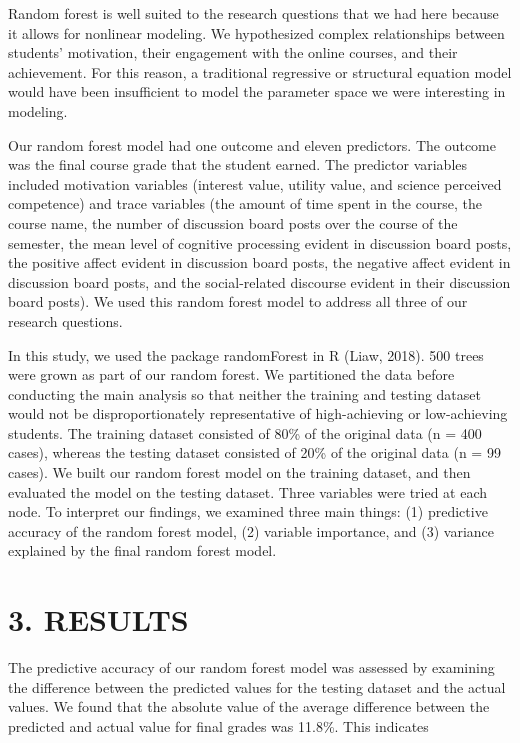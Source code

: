 \documentclass[acmart]{apa6}
\theoremstyle{definition}
\theoremstyle{definition}
\theoremstyle{definition}
\theoremstyle{remark}
\begin{document}
Random forest is well suited to the research questions that we had here
because it allows for nonlinear modeling. We hypothesized complex
relationships between students' motivation, their engagement with the
online courses, and their achievement. For this reason, a traditional
regressive or structural equation model would have been insufficient to
model the parameter space we were interesting in modeling.

Our random forest model had one outcome and eleven predictors. The
outcome was the final course grade that the student earned. The
predictor variables included motivation variables (interest value,
utility value, and science perceived competence) and trace variables
(the amount of time spent in the course, the course name, the number of
discussion board posts over the course of the semester, the mean level
of cognitive processing evident in discussion board posts, the positive
affect evident in discussion board posts, the negative affect evident in
discussion board posts, and the social-related discourse evident in
their discussion board posts). We used this random forest model to
address all three of our research questions.

In this study, we used the package randomForest in R (Liaw, 2018). 500
trees were grown as part of our random forest. We partitioned the data
before conducting the main analysis so that neither the training and
testing dataset would not be disproportionately representative of
high-achieving or low-achieving students. The training dataset consisted
of 80\% of the original data (n = 400 cases), whereas the testing
dataset consisted of 20\% of the original data (n = 99 cases). We built
our random forest model on the training dataset, and then evaluated the
model on the testing dataset. Three variables were tried at each node.
To interpret our findings, we examined three main things: (1) predictive
accuracy of the random forest model, (2) variable importance, and (3)
variance explained by the final random forest model.

\section{3. RESULTS}\label{results}

The predictive accuracy of our random forest model was assessed by
examining the difference between the predicted values for the testing
dataset and the actual values. We found that the absolute value of the
average difference between the predicted and actual value for final
grades was 11.8\%. This indicates
\end{document}
